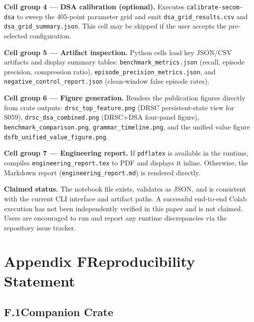 \documentclass[11pt,letterpaper]{article}
\theoremstyle{scresult}
\begin{document}
\medskip
\noindent\textbf{Cell group 4 --- DSA calibration (optional).}
Executes \texttt{calibrate-secom-dsa} to sweep the 405-point parameter grid
and emit \texttt{dsa\_grid\_results.csv} and \texttt{dsa\_grid\_summary.json}.
This cell may be skipped if the user accepts the pre-selected configuration.

\medskip
\noindent\textbf{Cell group 5 --- Artifact inspection.}
Python cells load key JSON/CSV artifacts and display summary tables:
\texttt{benchmark\_metrics.json} (recall, episode precision, compression
ratio), \texttt{episode\_precision\_metrics.json}, and
\texttt{negative\_control\_report.json} (clean-window false episode rates).

\medskip
\noindent\textbf{Cell group 6 --- Figure generation.}
Renders the publication figures directly from crate outputs:
\texttt{drsc\_top\_feature.png} (DRSC persistent-state view for S059),
\texttt{drsc\_dsa\_combined.png} (DRSC+DSA four-panel figure),
\texttt{benchmark\_comparison.png}, \texttt{grammar\_timeline.png},
and the unified value figure
\texttt{dsfb\_unified\_value\_figure.png}.

\medskip
\noindent\textbf{Cell group 7 --- Engineering report.}
If \texttt{pdflatex} is available in the runtime, compiles
\texttt{engineering\_report.tex} to PDF and displays it inline.
Otherwise, the Markdown report (\texttt{engineering\_report.md}) is
rendered directly.

\medskip
\noindent\textbf{Claimed status.}
The notebook file exists, validates as JSON, and is consistent with the
current CLI interface and artifact paths.  A successful end-to-end Colab
execution has not been independently verified in this paper and is not
claimed.  Users are encouraged to run and report any runtime discrepancies
via the repository issue tracker.

\clearpage

\section*{Appendix F\quad Reproducibility Statement}
\label{app:reproducibility}

\subsection*{F.1\quad Companion Crate}
\end{document}
